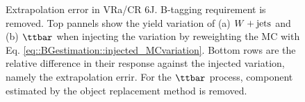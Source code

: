 \begin{figure}[h]
 \caption{Extrapolation error in VRa/CR 6J. B-tagging requirement is removed. Top pannels show the yield variation of (a) $W+\mathrm{jets}$ and (b) $\ttbar$ when injecting the variation by reweighting the MC with Eq. \ref{eq::BGestimation::injected_MCvariation}. Bottom rows are the relative difference in their response against the injected variation, namely the extrapolation errir. For the $\ttbar$ process, component estimated by the object replacement method is removed.  \label{fig::BGestimation::valid_extp_VRa6J} }
\end{figure}


